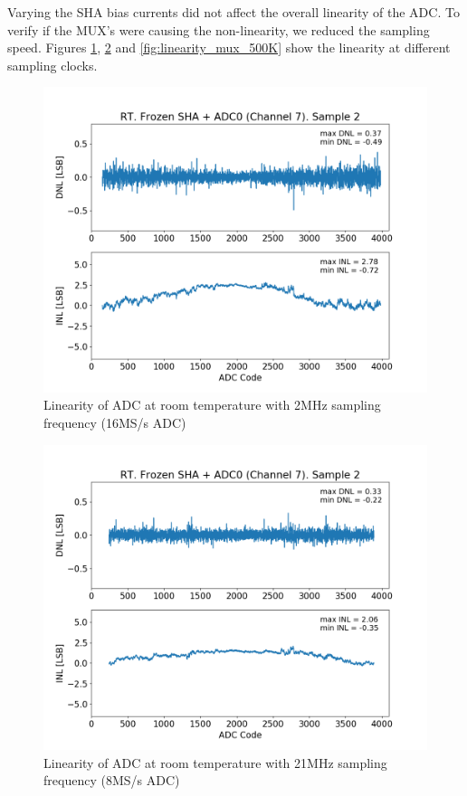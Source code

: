 Varying the SHA bias currents did not affect the overall linearity of the ADC. To verify if the MUX's were causing the non-linearity, we reduced the sampling speed. Figures \ref{fig:linearity_mux_2M}, \ref{fig:linearity_mux_1M} and \ref{fig:linearity_mux_500K} show the linearity at different sampling clocks. 
\begin{figure}[h!]
\centering
  \includegraphics[width=0.7\linewidth]{figures/prakash_fig/linearity_mux_2M.png}
  \caption{Linearity of ADC at room temperature with 2MHz sampling frequency (16MS/s ADC)}
  \label{fig:linearity_mux_2M}
\end{figure}

\begin{figure}[h!]
\centering
  \includegraphics[width=0.7\linewidth]{figures/prakash_fig/linearity_mux_1M.png}
  \caption{Linearity of ADC at room temperature with 21MHz sampling frequency (8MS/s ADC)}
  \label{fig:linearity_mux_1M}
\end{figure}

